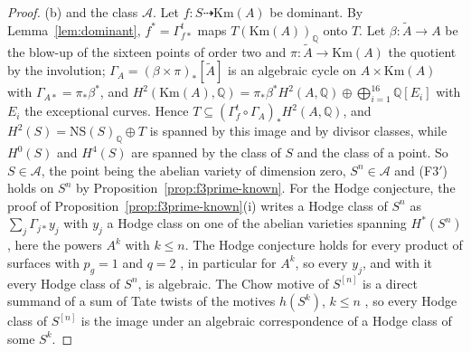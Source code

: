 \documentclass[11pt,reqno]{amsart}
\numberwithin{equation}{section}
\theoremstyle{plain}
\theoremstyle{definition}
\newcommand{\QQ}{\mathbb{Q}}
\newcommand{\NS}{\mathrm{NS}}
\newcommand{\Fiii}{\texorpdfstring{\textup{(F3$'$)}}{(F3')}}
\begin{document}
\begin{proof}
(b) and the class $\mathcal{A}$. Let $f\colon S\dashrightarrow\mathrm{Km}(A)$ be dominant. By Lemma~\ref{lem:dominant}, $f^{*}=\Gamma_{f*}^{t}$ maps $T(\mathrm{Km}(A))_{\QQ}$ onto $T$. Let $\beta\colon\tilde A\to A$ be the blow-up of the sixteen points of order two and $\pi\colon\tilde A\to\mathrm{Km}(A)$ the quotient by the involution; $\Gamma_{A}=(\beta\times\pi)_{*}[\tilde A]$ is an algebraic cycle on $A\times\mathrm{Km}(A)$ with $\Gamma_{A*}=\pi_{*}\beta^{*}$, and $H^{2}(\mathrm{Km}(A),\QQ)=\pi_{*}\beta^{*}H^{2}(A,\QQ)\oplus\bigoplus_{i=1}^{16}\QQ[E_{i}]$ with $E_{i}$ the exceptional curves. Hence $T\subseteq(\Gamma_{f}^{t}\circ\Gamma_{A})_{*}H^{2}(A,\QQ)$, and $H^{2}(S)=\NS(S)_{\QQ}\oplus T$ is spanned by this image and by divisor classes, while $H^{0}(S)$ and $H^{4}(S)$ are spanned by the class of $S$ and the class of a point. So $S\in\mathcal{A}$, the point being the abelian variety of dimension zero, $S^{n}\in\mathcal{A}$ and \Fiii{} holds on $S^{n}$ by Proposition~\ref{prop:f3prime-known}. For the Hodge conjecture, the proof of Proposition~\ref{prop:f3prime-known}(i) writes a Hodge class of $S^{n}$ as $\sum_{j}\Gamma_{j*}y_{j}$ with $y_{j}$ a Hodge class on one of the abelian varieties spanning $H^{*}(S^{n})$, here the powers $A^{k}$ with $k\le n$. The Hodge conjecture holds for every product of surfaces with $p_{g}=1$ and $q=2$ \cite{RM08}, in particular for $A^{k}$, so every $y_{j}$, and with it every Hodge class of $S^{n}$, is algebraic. The Chow motive of $S^{[n]}$ is a direct summand of a sum of Tate twists of the motives $h(S^{k})$, $k\le n$ \cite{dCM02}, so every Hodge class of $S^{[n]}$ is the image under an algebraic correspondence of a Hodge class of some $S^{k}$.
\end{proof}
\end{document}
